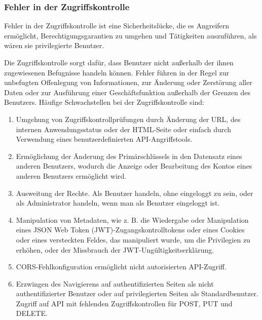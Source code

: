 \subsubsection{Fehler in der Zugriffskontrolle}

Fehler in der Zugriffskontrolle ist eine Sicherheitslücke,
die es Angreifern ermöglicht, Berechtigungsgarantien zu
umgehen und Tätigkeiten auszuführen, als wären sie
privilegierte Benutzer.

Die Zugriffskontrolle sorgt dafür, dass Benutzer nicht
außerhalb der ihnen zugewiesenen Befugnisse handeln
können. Fehler führen in der Regel zur unbefugten
Offenlegung von Informationen, zur \"Anderung oder Zerstörung
aller Daten oder zur Ausführung einer Geschäftsfunktion
außerhalb der Grenzen des Benutzers. Häufige Schwachstellen
bei der Zugriffskontrolle sind:

\begin{enumerate}
    \item Umgehung von Zugriffskontrollprüfungen durch
    \"Anderung der URL, des internen Anwendungsstatus oder
    der HTML-Seite oder einfach durch Verwendung eines
    benutzerdefinierten API-Angriffstools.

    \item Ermöglichung der Änderung des Primärschlüssels
    in den Datensatz eines anderen Benutzers, wodurch
    die Anzeige oder Bearbeitung des Kontos eines anderen
    Benutzers ermöglicht wird.

    \item Ausweitung der Rechte. Als Benutzer handeln, ohne
    eingeloggt zu sein, oder als Administrator handeln, wenn
    man als Benutzer eingeloggt ist.

    \item Manipulation von Metadaten, wie z. B. die
    Wiedergabe oder Manipulation eines JSON Web Token
    (JWT)-Zugangskontrolltokens oder eines Cookies oder
    eines versteckten Feldes, das manipuliert wurde, um
    die Privilegien zu erhöhen, oder der Missbrauch der
    JWT-Ungültigkeitserklärung.

    \item CORS-Fehlkonfiguration ermöglicht
    nicht autorisierten API-Zugriff.

    \item Erzwingen des Navigierens auf authentifizierten
    Seiten als nicht authentifizierter Benutzer oder
    auf privilegierten Seiten als Standardbenutzer.
    Zugriff auf API mit fehlenden Zugriffskontrollen
    für POST, PUT und DELETE.
\end{enumerate}
